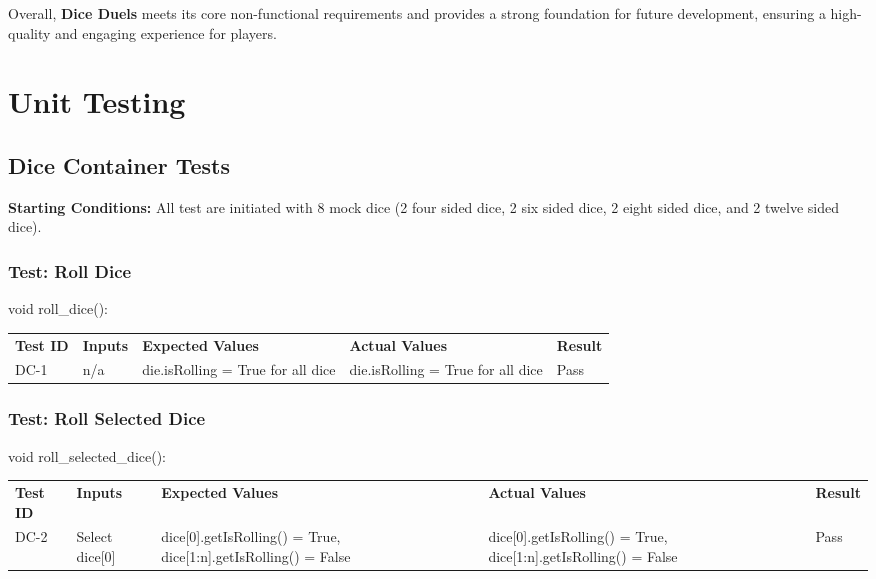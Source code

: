 \documentclass[12pt, titlepage]{article}
\begin{document}
Overall, \textbf{Dice Duels} meets its core non-functional requirements and provides a strong foundation for future development, ensuring a high-quality and engaging experience for players.




\newpage
\section{Unit Testing}

\subsection{Dice Container Tests}

\textbf{Starting Conditions:} All test are initiated with 8 mock dice (2 four sided dice, 2 six sided dice, 2 eight sided dice, and 2 twelve sided dice).

\subsubsection{Test: Roll Dice}
void roll\_dice():\\
\begin{tabularx}{\textwidth}{|p{2cm}|p{2.5cm}|p{3.75cm}|p{3.75cm}|p{1.5cm}|}
    \cline{1-5}
    \textbf{Test ID} & \textbf{Inputs} & \textbf{Expected Values} & \textbf{Actual Values} & \textbf{Result} \\
    \cline{1-5}
    DC-1 & n/a & die.isRolling = True for all dice & die.isRolling = True for all dice & Pass \\
    \cline{1-5}
\end{tabularx}

\subsubsection{Test: Roll Selected Dice}
void roll\_selected\_dice():\\
\begin{tabularx}{\textwidth}{|p{2cm}|p{2.5cm}|p{3.75cm}|p{3.75cm}|p{1.5cm}|}
    \cline{1-5}
    \textbf{Test ID} & \textbf{Inputs} & \textbf{Expected Values} & \textbf{Actual Values} & \textbf{Result} \\
    \cline{1-5}
    DC-2 & Select dice[0] & dice[0].getIsRolling() = True, dice[1:n].getIsRolling() = False & dice[0].getIsRolling() = True, dice[1:n].getIsRolling() = False & Pass \\
    \cline{1-5}
\end{tabularx}
\end{document}
